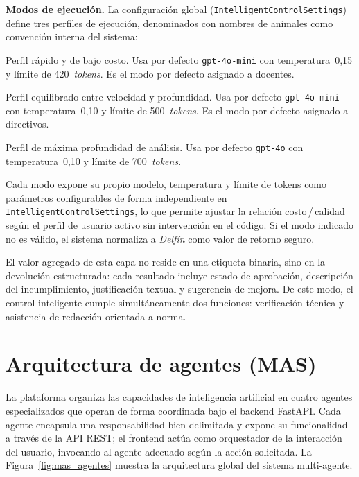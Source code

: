 \medskip
\noindent\textbf{Modos de ejecución.}
La configuración global (\texttt{IntelligentControlSettings}) define tres
perfiles de ejecución, denominados con nombres de animales como convención
interna del sistema:

\begin{description}[noitemsep, leftmargin=1.4cm, labelwidth=1.2cm]
  \item[\textit{Guepardo}] Perfil rápido y de bajo costo.
    Usa por defecto \texttt{gpt-4o-mini} con temperatura~0{,}15 y límite de
    420~\textit{tokens}.
    Es el modo por defecto asignado a docentes.
  \item[\textit{Delfín}]  Perfil equilibrado entre velocidad y profundidad.
    Usa por defecto \texttt{gpt-4o-mini} con temperatura~0{,}10 y límite de
    500~\textit{tokens}.
    Es el modo por defecto asignado a directivos.
  \item[\textit{Ballena}] Perfil de máxima profundidad de análisis.
    Usa por defecto \texttt{gpt-4o} con temperatura~0{,}10 y límite de
    700~\textit{tokens}.

\end{description}

Cada modo expone su propio modelo, temperatura y límite de tokens como
parámetros configurables de forma independiente en
\texttt{IntelligentControlSettings}, lo que permite ajustar la relación
costo\,/\,calidad según el perfil de usuario activo sin intervención en el
código.
Si el modo indicado no es válido, el sistema normaliza a \textit{Delfín}
como valor de retorno seguro.

El valor agregado de esta capa no reside en una etiqueta binaria, sino en
la devolución estructurada: cada resultado incluye estado de aprobación,
descripción del incumplimiento, justificación textual y sugerencia de
mejora. De este modo, el control inteligente cumple simultáneamente dos
funciones: verificación técnica y asistencia de redacción orientada a
norma.

\section{Arquitectura de agentes (MAS)}
\label{sec:agentes}

La plataforma organiza las capacidades de inteligencia artificial en cuatro
agentes especializados que operan de forma coordinada bajo el backend FastAPI.
Cada agente encapsula una responsabilidad bien delimitada y expone su
funcionalidad a través de la API REST; el frontend actúa como orquestador
de la interacción del usuario, invocando al agente adecuado según la acción
solicitada.
La Figura~\ref{fig:mas_agentes} muestra la arquitectura global del sistema
multi-agente.

